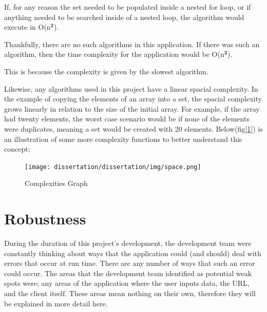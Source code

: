\bigskip

If, for any reason the set needed to be populated inside a nested for loop, or if anything needed to be searched inside of a nested loop, the algorithm would execute in O(n\begin{math}\mathbf{^2}\end{math}). 

Thankfully, there are no such algorithms in this application. If there was such an algorithm, then the time complexity for the application would be O(n\begin{math}\mathbf{^2}\end{math}).

This is because the complexity is given by the slowest algorithm. 

\bigskip

Likewise, any algorithms used in this project have a linear spacial complexity. In the example of copying the elements of an array into a set, the spacial complexity grows linearly in relation to the size of the initial array. For example, if the array had twenty elements, the worst case scenario would be if none of the elements were duplicates, meaning a set would be created with 20 elements. 
Below(fig[\ref{fig:bigO}]) is an illustration of some more complexity functions to better understand this concept;

\begin{figure}[H]
    \centering
    \texttt{[image: dissertation/dissertation/img/space.png]}
    \caption{Complexities Graph}
    \label{fig:bigO}
\end{figure}

\bigskip



\section{Robustness}
\label{sec:SystemEvaluationRobustness}

During the duration of this project's development, the development team were constantly thinking about ways that the application could (and should) deal with errors that occur at run time. There are any number of ways that such an error could occur. The areas that the development team identified as potential weak spots were; any areas of the application where the user inputs data, the URL, and the client itself. These areas mean nothing on their own, therefore they will be explained in more detail here.

